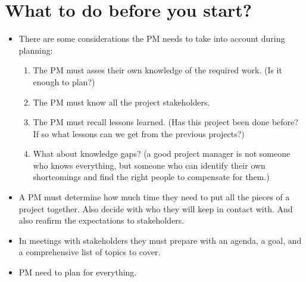 \section{What to do before you start?}
\begin{itemize}
    \item There are some considerations the PM needs to take into account during planning:
        \begin{enumerate}
            \item The PM must asses their own knowledge of the required work. (Is it enough to plan?)
            \item The PM must know all the project stakeholders.
            \item The PM must recall lessons learned. (Has this project been done before? If so what lessons can we get from the previous projects?)
            \item What about knowledge gaps? (a good project manager is not someone who knows everything, but someone who can identify their own shortcomings and find the right people to compensate for them.)
        \end{enumerate}
    
    \item A PM must determine how much time they need to put all the pieces of a project together. Also decide with who they will keep in contact with. And also reafirm the expectations to stakeholders.
    \item In meetings with stakeholders they must prepare with an agenda, a goal, and a comprehensive list of topics to cover.
    \item PM need to plan for everything.
\end{itemize}

